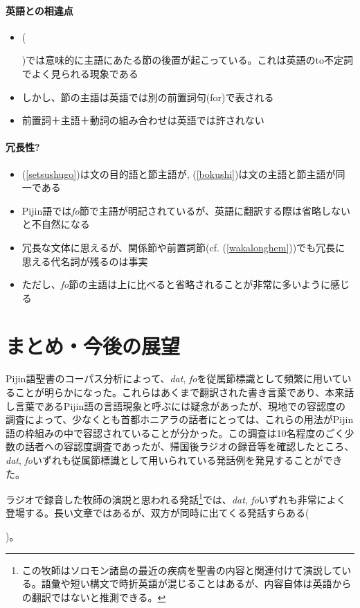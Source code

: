 \documentclass[11pt,a4paper]{jsarticle}
\newcounter{tempcnt}
\newcommand{\exn}[1]{%
\setcounter{tempcnt}{\value{exx}}%
\addtocounter{tempcnt}{#1}%
\arabic{tempcnt}}
\begin{document}
\paragraph{英語との相違点}
\begin{itemize}
  \item (\exn{0})では意味的に主語にあたる節の後置が起こっている。これは英語のto不定詞でよく見られる現象である\citep[1062]{english}
  \item しかし、節の主語は英語では別の前置詞句(for)で表される\citep[1061]{english}
  \item 前置詞＋主語＋動詞の組み合わせは英語では許されない\citep[660]{english}
\end{itemize}
\paragraph{冗長性?}
\begin{itemize}
  \item (\ref{setsushugo})は文の目的語と節主語が, (\ref{bokushi})は文の主語と節主語が同一である
  \item Pijin語では\textit{fo}節で主語が明記されているが、英語に翻訳する際は省略しないと不自然になる
  \item 冗長な文体に思えるが、関係節や前置詞節(cf. (\ref{wakalonghem}))でも冗長に思える代名詞が残るのは事実
  \item ただし、\textit{fo}節の主語は上に比べると省略されることが非常に多いように感じる
\end{itemize}

\section{まとめ・今後の展望}
Pijin語聖書のコーパス分析によって、\textit{dat}, \textit{fo}を従属節標識として頻繁に用いていることが明らかになった。これらはあくまで翻訳された書き言葉であり、本来話し言葉であるPijin語の言語現象と呼ぶには疑念があったが、現地での容認度の調査によって、少なくとも首都ホニアラの話者にとっては、これらの用法がPijin語の枠組みの中で容認されていることが分かった。この調査は10名程度のごく少数の話者への容認度調査であったが、帰国後ラジオの録音等を確認したところ、\textit{dat}, \textit{fo}いずれも従属節標識として用いられている発話例を発見することができた。

ラジオで録音した牧師の演説と思われる発話\footnote{この牧師はソロモン諸島の最近の疾病を聖書の内容と関連付けて演説している。語彙や短い構文で時折英語が混じることはあるが、内容自体は英語からの翻訳ではないと推測できる。}では、\textit{dat}, \textit{fo}いずれも非常によく登場する。長い文章ではあるが、双方が同時に出てくる発話すらある(\exn{1})。
\end{document}
